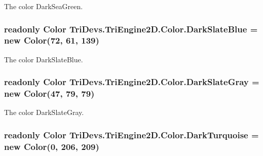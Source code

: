 The color Dark\-Sea\-Green. 

\hypertarget{struct_tri_devs_1_1_tri_engine2_d_1_1_color_a7f02422c2aed4a2127e7cbc30a3549ef}{
\subsubsection[{Dark\-Slate\-Blue}]{\setlength{\rightskip}{0pt plus 5cm}readonly {\bf Color} Tri\-Devs.\-Tri\-Engine2\-D.\-Color.\-Dark\-Slate\-Blue = new {\bf Color}(72, 61, 139)\hspace{0.3cm}{\ttfamily [static]}}}\label{struct_tri_devs_1_1_tri_engine2_d_1_1_color_a7f02422c2aed4a2127e7cbc30a3549ef}


The color Dark\-Slate\-Blue. 

\hypertarget{struct_tri_devs_1_1_tri_engine2_d_1_1_color_ac2994eaae8f3988f184a87a2f1e8feaa}{
\subsubsection[{Dark\-Slate\-Gray}]{\setlength{\rightskip}{0pt plus 5cm}readonly {\bf Color} Tri\-Devs.\-Tri\-Engine2\-D.\-Color.\-Dark\-Slate\-Gray = new {\bf Color}(47, 79, 79)\hspace{0.3cm}{\ttfamily [static]}}}\label{struct_tri_devs_1_1_tri_engine2_d_1_1_color_ac2994eaae8f3988f184a87a2f1e8feaa}


The color Dark\-Slate\-Gray. 

\hypertarget{struct_tri_devs_1_1_tri_engine2_d_1_1_color_a44e6e2ed59740a79d52fdcfb3ca52178}{
\subsubsection[{Dark\-Turquoise}]{\setlength{\rightskip}{0pt plus 5cm}readonly {\bf Color} Tri\-Devs.\-Tri\-Engine2\-D.\-Color.\-Dark\-Turquoise = new {\bf Color}(0, 206, 209)\hspace{0.3cm}{\ttfamily [static]}}}\label{struct_tri_devs_1_1_tri_engine2_d_1_1_color_a44e6e2ed59740a79d52fdcfb3ca52178}


